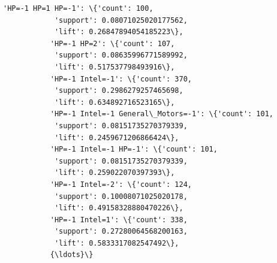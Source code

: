 \documentclass[11pt]{article}
\begin{document}
\begin{Verbatim}[commandchars=\\\{\}]
           'HP=-1 HP=1 HP=-1': \{'count': 100,
            'support': 0.08071025020177562,
            'lift': 0.26847894054185223\},
           'HP=-1 HP=2': \{'count': 107,
            'support': 0.08635996771589992,
            'lift': 0.517537798493916\},
           'HP=-1 Intel=-1': \{'count': 370,
            'support': 0.2986279257465698,
            'lift': 0.634892716523165\},
           'HP=-1 Intel=-1 General\_Motors=-1': \{'count': 101,
            'support': 0.08151735270379339,
            'lift': 0.2459671206866424\},
           'HP=-1 Intel=-1 HP=-1': \{'count': 101,
            'support': 0.08151735270379339,
            'lift': 0.259022070397393\},
           'HP=-1 Intel=-2': \{'count': 124,
            'support': 0.10008071025020178,
            'lift': 0.49158328880470226\},
           'HP=-1 Intel=1': \{'count': 338,
            'support': 0.27280064568200163,
            'lift': 0.5833317082547492\},
           {\ldots}\}
\end{Verbatim}
            
\end{document}
